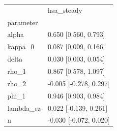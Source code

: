 \begin{tabular}{ll}
\toprule
 & hsa\_steady \\
parameter &  \\
\midrule
alpha & 0.650 [0.560, 0.793] \\
kappa\_0 & 0.087 [0.009, 0.166] \\
delta & 0.030 [0.003, 0.054] \\
rho\_1 & 0.867 [0.578, 1.097] \\
rho\_2 & -0.005 [-0.278, 0.297] \\
phi\_1 & 0.946 [0.903, 0.984] \\
lambda\_ez & 0.022 [-0.139, 0.261] \\
n & -0.030 [-0.072, 0.020] \\
\bottomrule
\end{tabular}
